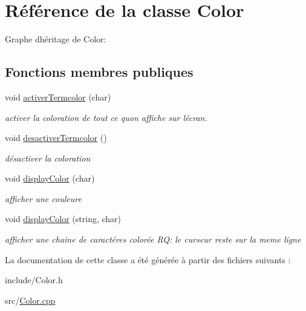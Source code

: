 \hypertarget{class_color}{}\section{Référence de la classe Color}
\label{class_color}


Graphe d\textquotesingle{}héritage de Color\+:
\subsection*{Fonctions membres publiques}
\begin{DoxyCompactItemize}
\item 
void \hyperlink{class_color_a024a64972cecb3851790840d0101e485}{activer\+Termcolor} (char)\hypertarget{class_color_a024a64972cecb3851790840d0101e485}{}\label{class_color_a024a64972cecb3851790840d0101e485}

\begin{DoxyCompactList}\small\item\em activer la coloration de tout ce qu\textquotesingle{}on affiche sur l\textquotesingle{}écran. \end{DoxyCompactList}\item 
void \hyperlink{class_color_a9b6dce5671d9ebb5258da42d34aba6d7}{desactiver\+Termcolor} ()\hypertarget{class_color_a9b6dce5671d9ebb5258da42d34aba6d7}{}\label{class_color_a9b6dce5671d9ebb5258da42d34aba6d7}

\begin{DoxyCompactList}\small\item\em désactiver la coloration \end{DoxyCompactList}\item 
void \hyperlink{class_color_a7a59cffa33fa8b850c07dd6272f7b228}{display\+Color} (char)\hypertarget{class_color_a7a59cffa33fa8b850c07dd6272f7b228}{}\label{class_color_a7a59cffa33fa8b850c07dd6272f7b228}

\begin{DoxyCompactList}\small\item\em afficher une couleure \end{DoxyCompactList}\item 
void \hyperlink{class_color_af3e68470d1bbb7322b313d8621e16af1}{display\+Color} (string, char)\hypertarget{class_color_af3e68470d1bbb7322b313d8621e16af1}{}\label{class_color_af3e68470d1bbb7322b313d8621e16af1}

\begin{DoxyCompactList}\small\item\em afficher une chaine de caractéres colorée RQ\+: le curseur reste sur la meme ligne \end{DoxyCompactList}\end{DoxyCompactItemize}


La documentation de cette classe a été générée à partir des fichiers suivants \+:\begin{DoxyCompactItemize}
\item 
include/Color.\+h\item 
src/\hyperlink{_color_8cpp}{Color.\+cpp}\end{DoxyCompactItemize}
